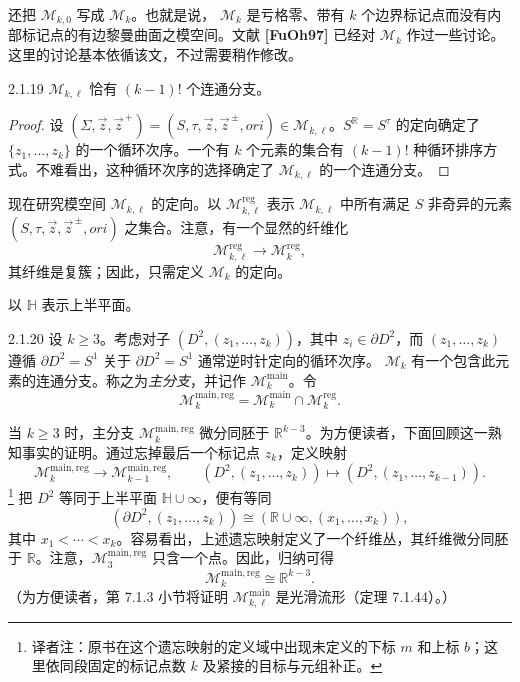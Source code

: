 还把 $\mathcal M_{k,0}$ 写成 $\mathcal M_k$。也就是说，
$\mathcal M_k$ 是亏格零、带有 $k$ 个边界标记点而没有内部标记点的有边黎曼曲面之模空间。文献
\textbf{[FuOh97]} 已经对 $\mathcal M_k$ 作过一些讨论。这里的讨论基本依循该文，不过需要稍作修改。

\begin{lemma}{2.1.19}\label{lem:2-1-19}
$\mathcal M_{k,\ell}$ 恰有 $(k-1)!$ 个连通分支。
\end{lemma}

\begin{proof}
设
$(\Sigma,\vec z,\vec z^{\,+})
=(S,\tau,\vec z,\vec z^{\,\pm},\mathit{ori})
\in\mathcal M_{k,\ell}$。$S^{\mathbb R}=S^\tau$ 的定向确定了
$\{z_1,\ldots,z_k\}$ 的一个循环次序。一个有 $k$ 个元素的集合有
$(k-1)!$ 种循环排序方式。不难看出，这种循环次序的选择确定了
$\mathcal M_{k,\ell}$ 的一个连通分支。
\end{proof}

现在研究模空间 $\mathcal M_{k,\ell}$ 的定向。以
$\mathcal M_{k,\ell}^{\mathrm{reg}}$ 表示 $\mathcal M_{k,\ell}$ 中所有满足
$S$ 非奇异的元素 $(S,\tau,\vec z,\vec z^{\,\pm},\mathit{ori})$ 之集合。注意，有一个显然的纤维化
\[
  \mathcal M_{k,\ell}^{\mathrm{reg}}
  \longrightarrow\mathcal M_k^{\mathrm{reg}},
\]
其纤维是复簇；因此，只需定义 $\mathcal M_k$ 的定向。

以 $\mathbb H$ 表示上半平面。

\begin{definition}{2.1.20}\label{def:2-1-20}
设 $k\geq3$。考虑对子 $(D^2,(z_1,\ldots,z_k))$，其中
$z_i\in\partial D^2$，而 $(z_1,\ldots,z_k)$ 遵循
$\partial D^2=S^1$ 关于 $\partial D^2=S^1$ 通常逆时针定向的循环次序。
$\mathcal M_k$ 有一个包含此元素的连通分支。称之为\emph{主分支}，并记作
$\mathcal M_k^{\mathrm{main}}$。令
\[
  \mathcal M_k^{\mathrm{main,reg}}
  =\mathcal M_k^{\mathrm{main}}\cap\mathcal M_k^{\mathrm{reg}}.
\]
\end{definition}

当 $k\geq3$ 时，主分支
$\mathcal M_k^{\mathrm{main,reg}}$ 微分同胚于 $\mathbb R^{k-3}$。为方便读者，下面回顾这一熟知事实的证明。通过忘掉最后一个标记点 $z_k$，定义映射
\[
  \mathcal M_k^{\mathrm{main,reg}}
  \longrightarrow\mathcal M_{k-1}^{\mathrm{main,reg}},
  \qquad
  (D^2,(z_1,\ldots,z_k))
  \longmapsto(D^2,(z_1,\ldots,z_{k-1})).
\]
\footnote{译者注：原书在这个遗忘映射的定义域中出现未定义的下标 $m$ 和上标 $b$；这里依同段固定的标记点数 $k$ 及紧接的目标与元组补正。}
把 $D^2$ 等同于上半平面 $\mathbb H\cup\infty$，便有等同
\[
  (\partial D^2,(z_1,\ldots,z_k))
  \cong(\mathbb R\cup\infty,(x_1,\ldots,x_k)),
\]
其中 $x_1<\cdots<x_k$。容易看出，上述遗忘映射定义了一个纤维丛，其纤维微分同胚于
$\mathbb R$。注意，$\mathcal M_3^{\mathrm{main,reg}}$ 只含一个点。因此，归纳可得
\[
  \mathcal M_k^{\mathrm{main,reg}}\cong\mathbb R^{k-3}.
\]
（为方便读者，第 7.1.3 小节将证明
$\mathcal M_{k,\ell}^{\mathrm{main}}$ 是光滑流形（定理 7.1.44）。）

